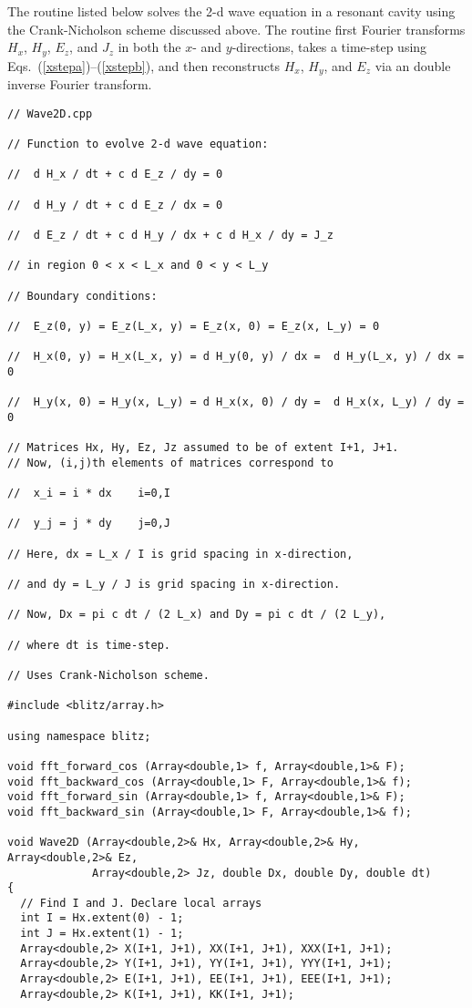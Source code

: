 The routine listed below solves the 2-d wave equation in a resonant
cavity using the Crank-Nicholson scheme
discussed above. The routine first Fourier transforms $H_x$, $H_y$, $E_z$, and
$J_z$ in both the $x$- and $y$-directions, takes
a time-step using Eqs.~(\ref{xstepa})--(\ref{xstepb}), and then reconstructs
$H_x$, $H_y$, and $E_z$  via an double inverse Fourier transform.
{\small\begin{verbatim}
// Wave2D.cpp

// Function to evolve 2-d wave equation:

//  d H_x / dt + c d E_z / dy = 0

//  d H_y / dt + c d E_z / dx = 0

//  d E_z / dt + c d H_y / dx + c d H_x / dy = J_z

// in region 0 < x < L_x and 0 < y < L_y

// Boundary conditions:

//  E_z(0, y) = E_z(L_x, y) = E_z(x, 0) = E_z(x, L_y) = 0

//  H_x(0, y) = H_x(L_x, y) = d H_y(0, y) / dx =  d H_y(L_x, y) / dx = 0

//  H_y(x, 0) = H_y(x, L_y) = d H_x(x, 0) / dy =  d H_x(x, L_y) / dy = 0

// Matrices Hx, Hy, Ez, Jz assumed to be of extent I+1, J+1.
// Now, (i,j)th elements of matrices correspond to

//  x_i = i * dx    i=0,I

//  y_j = j * dy    j=0,J

// Here, dx = L_x / I is grid spacing in x-direction,

// and dy = L_y / J is grid spacing in x-direction.

// Now, Dx = pi c dt / (2 L_x) and Dy = pi c dt / (2 L_y),

// where dt is time-step.

// Uses Crank-Nicholson scheme.

#include <blitz/array.h>

using namespace blitz;

void fft_forward_cos (Array<double,1> f, Array<double,1>& F);
void fft_backward_cos (Array<double,1> F, Array<double,1>& f);
void fft_forward_sin (Array<double,1> f, Array<double,1>& F);
void fft_backward_sin (Array<double,1> F, Array<double,1>& f);

void Wave2D (Array<double,2>& Hx, Array<double,2>& Hy, Array<double,2>& Ez,
             Array<double,2> Jz, double Dx, double Dy, double dt)
{
  // Find I and J. Declare local arrays
  int I = Hx.extent(0) - 1;
  int J = Hx.extent(1) - 1;
  Array<double,2> X(I+1, J+1), XX(I+1, J+1), XXX(I+1, J+1);
  Array<double,2> Y(I+1, J+1), YY(I+1, J+1), YYY(I+1, J+1); 
  Array<double,2> E(I+1, J+1), EE(I+1, J+1), EEE(I+1, J+1);
  Array<double,2> K(I+1, J+1), KK(I+1, J+1);


\end{verbatim}}
